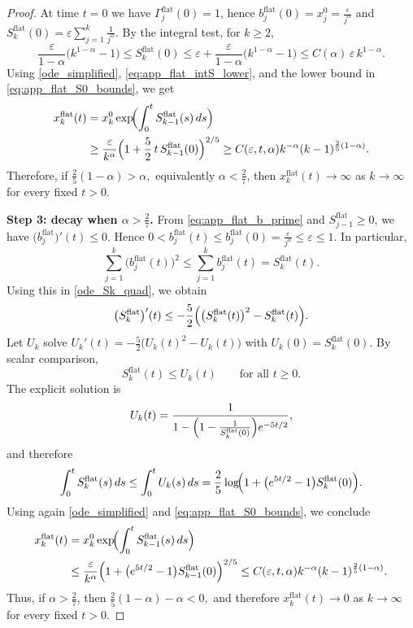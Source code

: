 \documentclass[reqno,11pt]{amsart}
\begin{document}
\begin{proof}
At time $t=0$ we have $\Gamma_j^{\mathrm{flat}}(0)=1$, hence
$
b_j^{\mathrm{flat}}(0)=x_j^0=\frac{\varepsilon}{j^\alpha}$ and $
S_k^{\mathrm{flat}}(0)
=
\varepsilon\sum_{j=1}^k \frac{1}{j^\alpha}.$
By the integral test, for $k\ge2$,
\begin{equation}
\label{eq:app_flat_S0_bounds}
\frac{\varepsilon}{1-\alpha}\bigl(k^{1-\alpha}-1\bigr)
\le
S_k^{\mathrm{flat}}(0)
\le
\varepsilon+\frac{\varepsilon}{1-\alpha}\bigl(k^{1-\alpha}-1\bigr)
\leq C(\alpha) \, \varepsilon\,k^{1-\alpha}.
\end{equation}
Using \eqref{ode_simplified}, \eqref{eq:app_flat_intS_lower}, and the lower bound in
\eqref{eq:app_flat_S0_bounds}, we get
\begin{align*}
x_k^{\mathrm{flat}}(t)
&=
x_k^0\exp\!\Bigl(\int_0^t S_{k-1}^{\mathrm{flat}}(s)\,ds\Bigr)
\nonumber\\
&\ge
\frac{\varepsilon}{k^\alpha}
\Bigl(1+\frac52\,t\,S_{k-1}^{\mathrm{flat}}(0)\Bigr)^{2/5}
\geq C(\varepsilon,t,\alpha)
k^{-\alpha}(k-1)^{\frac25(1-\alpha)}.
\end{align*}
Therefore, if $\frac25(1-\alpha)>\alpha,$
equivalently $\alpha<\frac27$, then $x_k^{\mathrm{flat}}(t)\to\infty$ as $k\to\infty$ for
every fixed $t>0$.



\medskip
\noindent\textbf{Step 3: decay when $\alpha>\frac27$.}
From \eqref{eq:app_flat_b_prime} and $S_{j-1}^{\mathrm{flat}}\ge0$, we have $\bigl(b_j^{\mathrm{flat}}\bigr)'(t)\le0.$
Hence $0<b_j^{\mathrm{flat}}(t)\le b_j^{\mathrm{flat}}(0)=\frac{\varepsilon}{j^\alpha}\le \varepsilon\le1.$
In particular,
\[
\sum_{j=1}^k \bigl(b_j^{\mathrm{flat}}(t)\bigr)^2
\le
\sum_{j=1}^k b_j^{\mathrm{flat}}(t)
=
S_k^{\mathrm{flat}}(t).
\]
Using this in \eqref{ode_Sk_quad}, we obtain
\begin{equation*}
\bigl(S_k^{\mathrm{flat}}\bigr)'(t)
\le
-\frac52\Bigl(\bigl(S_k^{\mathrm{flat}}(t)\bigr)^2-S_k^{\mathrm{flat}}(t)\Bigr).
\end{equation*}
Let $U_k$ solve
$U_k'(t)=-\frac52\bigl(U_k(t)^2-U_k(t)\bigr)$ with $
U_k(0)=S_k^{\mathrm{flat}}(0). $
By scalar comparison,
\[
S_k^{\mathrm{flat}}(t)\le U_k(t)\qquad\text{for all }t\ge0.
\]
The explicit solution is
\[
U_k(t)=\frac{1}{1-\Bigl(1-\frac{1}{S_k^{\mathrm{flat}}(0)}\Bigr)e^{-5t/2}},
\]
and therefore
\[
\int_0^t S_k^{\mathrm{flat}}(s)\,ds
\le
\int_0^t U_k(s)\,ds
=
\frac25\log\!\Bigl(1+\bigl(e^{5t/2}-1\bigr)S_k^{\mathrm{flat}}(0)\Bigr).
\]
Using again \eqref{ode_simplified} and \eqref{eq:app_flat_S0_bounds}, we conclude
\begin{align}
\label{eq:xk_upper_flat}
x_k^{\mathrm{flat}}(t)
&=
x_k^0\exp\!\Bigl(\int_0^t S_{k-1}^{\mathrm{flat}}(s)\,ds\Bigr)
\nonumber\\
&\le
\frac{\varepsilon}{k^\alpha}
\Bigl(1+\bigl(e^{5t/2}-1\bigr)S_{k-1}^{\mathrm{flat}}(0)\Bigr)^{2/5}
\leq
C(\varepsilon,t,\alpha)
k^{-\alpha}(k-1)^{\frac25(1-\alpha)}.
\end{align}
Thus, if $\alpha>\frac27$, then $\frac25(1-\alpha)-\alpha<0,$
and therefore $x_k^{\mathrm{flat}}(t)\to0$ as $k\to\infty$ for every fixed $t>0$.


\end{proof}
\end{document}
